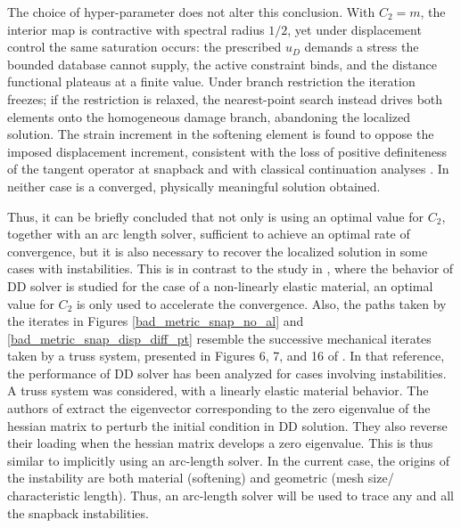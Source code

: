 \documentclass[10pt]{cas-sc}
\newenvironment{deletedblock}
{\begin{tcbstrikeout}\color{red}}
	{\end{tcbstrikeout}}
\begin{document}
\begin{deletedblock}
	The choice of hyper-parameter does not alter this conclusion. With $C_2 = m$, the interior map is contractive with spectral radius $1/2$, yet under displacement control the same saturation occurs: the prescribed $u_D$ demands a stress the bounded database cannot supply, the active constraint binds, and the distance functional plateaus at a finite value. Under branch restriction the iteration freezes; if the restriction is relaxed, the nearest-point search instead drives both elements onto the homogeneous damage branch, abandoning the localized solution. The strain increment in the softening element is found to oppose the imposed displacement increment, consistent with the loss of positive definiteness of the tangent operator at snapback and with classical continuation analyses \cite{deBorst1986,deBorst1987b,Baldelli2021}. In neither case is a converged, physically meaningful solution obtained.	
\end{deletedblock}
\begin{deletedblock}	
	Thus, it can be briefly concluded that not only is using an optimal value for $C_2$, together with an arc length solver, sufficient to achieve an optimal rate of convergence, but it is also necessary to recover the localized solution in some cases with instabilities. This is in contrast to the study in \cite{Nguyen2022}, where the behavior of DD solver is studied for the case of a non-linearly elastic material, an optimal value for $C_2$ is only used to accelerate the convergence. Also, the paths taken by the iterates in Figures \ref{bad_metric_snap_no_al} and \ref{bad_metric_snap_disp_diff_pt} resemble the successive mechanical iterates taken by a truss system, presented in Figures 6, 7, and 16 of \cite{Kuang2023}. In that reference, the performance of DD solver has been analyzed for cases involving instabilities. A truss system was considered, with a linearly elastic material behavior. The authors of \cite{Kuang2023} extract the eigenvector corresponding to the zero eigenvalue of the hessian matrix to perturb the initial condition in DD solution. They also reverse their loading when the hessian matrix develops a zero eigenvalue. This is thus similar to implicitly using an arc-length solver. In the current case, the origins of the instability are both material (softening) and geometric (mesh size/ characteristic length). Thus, an arc-length solver will be used to trace any and all the  snapback instabilities.
\end{deletedblock}
\end{document}
